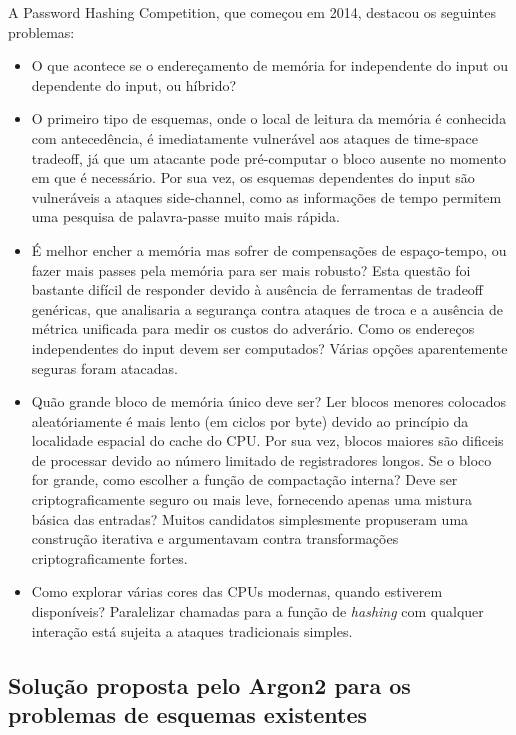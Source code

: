 \documentclass[conference]{IEEEtran}
\begin{document}
A Password Hashing Competition, que começou em 2014, destacou os seguintes problemas: 
\begin{itemize}
\item O que acontece se o endereçamento de memória for independente do input ou 
dependente do input, ou híbrido? 
\item O primeiro tipo de esquemas, onde o local de leitura da memória é conhecida 
com antecedência, é imediatamente vulnerável aos ataques de time-space tradeoff, 
já que um atacante pode pré-computar o bloco ausente no momento em que é necessário. 
Por sua vez, os esquemas dependentes do input são vulneráveis a ataques side-channel, 
como as informações de tempo permitem uma pesquisa de palavra-passe muito mais rápida. 
\item É melhor encher a memória mas sofrer de compensações de espaço-tempo, ou fazer 
mais passes pela memória para ser mais robusto? Esta questão foi bastante difícil 
de responder devido à ausência de ferramentas de tradeoff genéricas, 
que analisaria a segurança contra ataques de troca e a ausência de métrica 
unificada para medir os custos do adverário. Como os endereços independentes do 
input devem ser computados? Várias opções aparentemente seguras foram atacadas.
\item Quão grande bloco de memória único deve ser? Ler blocos menores colocados 
aleatóriamente é mais lento (em ciclos por byte) devido ao princípio da 
localidade espacial do cache do CPU. Por sua vez, blocos maiores são dificeis 
de processar devido ao número limitado de registradores longos. Se o bloco 
for grande, como escolher a função de compactação interna? Deve ser criptograficamente 
seguro ou mais leve, fornecendo apenas uma mistura básica das entradas? 
Muitos candidatos simplesmente propuseram uma construção iterativa e argumentavam 
contra transformações criptograficamente fortes. 
\item Como explorar várias cores das CPUs modernas, quando estiverem disponíveis? 
Paralelizar chamadas para a função de \textit{hashing} com qualquer interação está sujeita 
a ataques tradicionais simples.
\end{itemize} \cite{argon2spec}

\subsection{Solução proposta pelo Argon2 para os problemas de esquemas existentes}
\end{document}
